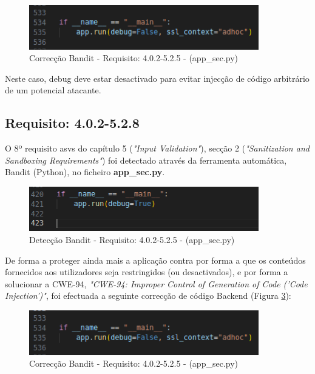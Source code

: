 \begin{figure}[H]
      \centering
      \includegraphics[width=10cm]{images/cordebug.png}
      \caption{Correcção Bandit - Requisito: 4.0.2-5.2.5 - (app\_sec.py)}
      \label{fig:cor5.2.5}
\end{figure}

Neste caso, debug deve estar desactivado para evitar injecção de código arbitrário de um potencial atacante.

\subsection*{Requisito: 4.0.2-5.2.8}

O 8º requisito \ac{asvs} do capítulo 5 (\textit{"Input Validation"}), secção 2  (\textit{"Sanitization and Sandboxing Requirements"}) foi detectado através da ferramenta automática, Bandit (Python), no ficheiro \textbf{app\_sec.py}.

\begin{figure}[H]
      \centering
      \includegraphics[width=10cm]{images/detdebug.png}
      \caption{Detecção Bandit - Requisito: 4.0.2-5.2.5 - (app\_sec.py)}
      \label{fig:det5.2.8}
\end{figure}

De forma a proteger ainda mais a aplicação contra por forma a que os conteúdos fornecidos aos utilizadores seja restringidos (ou desactivados), e por forma a solucionar a CWE-94, \textit{"CWE-94: Improper Control of Generation of Code ('Code Injection')"}, foi efectuada a seguinte correcção de código Backend (Figura \ref{fig:cor5.2.8}):

\begin{figure}[H]
      \centering
      \includegraphics[width=10cm]{images/cordebug.png}
      \caption{Correcção Bandit - Requisito: 4.0.2-5.2.5 - (app\_sec.py)}
      \label{fig:cor5.2.8}
\end{figure}

